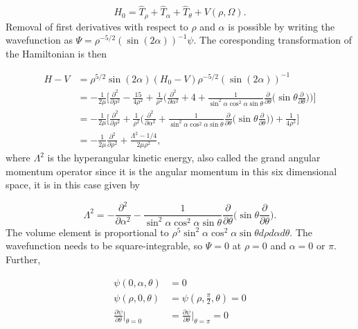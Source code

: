 \documentclass{article}
\numberwithin{equation}{section}
\begin{document}
\begin{equation}
H_0 = \hat{T}_{\rho} + \hat{T}_{\alpha} + \hat{T}_{\theta} + V(\rho,\Omega).
\end{equation}                      		
Removal of first derivatives with respect to $\rho$ and $\alpha$ is possible by writing the wavefunction as $\Psi = \rho^{-5/2}(\sin(2\alpha))^{-1}\psi$. The coresponding transformation of the Hamiltonian is then


\begin{align}
	H-V &= \rho^{5/2}\sin(2\alpha) (H_0-V) \rho^{-5/2}(\sin(2\alpha))^{-1}\nonumber\\
	    &= -\frac{1}{2\mu} \bigg[ \frac{\partial^2}{\partial\rho^2} - \frac{15}{4\rho^2} + \frac{1}{\rho^2}\bigg( \frac{\partial^2}{\partial\alpha^2} + 4 + \frac{1}{\sin^2\alpha\cos^2\alpha\sin\theta} \frac{\partial}{\partial\theta} \bigg( \sin\theta \frac{\partial}{\partial\theta} \bigg) \bigg) \bigg]\nonumber\\
	    &= -\frac{1}{2\mu} \bigg[ \frac{\partial^2}{\partial\rho^2} + \frac{1}{\rho^2}\bigg( \frac{\partial^2}{\partial\alpha^2} + \frac{1}{\sin^2\alpha\cos^2\alpha\sin\theta} \frac{\partial}{\partial\theta} \bigg( \sin\theta \frac{\partial}{\partial\theta} \bigg) \bigg) + \frac{1}{4\rho^2} \bigg]\nonumber\\
	    &= -\frac{1}{2\mu}\frac{\partial^2}{\partial\rho^2} + \frac{\Lambda^2 - 1/4}{2\mu\rho^2},
\end{align}   
where $\Lambda^2$ is the hyperangular kinetic energy, also called the grand angular momentum operator since it is the angular momentum in this six dimensional space, it is in this case given by 

\begin{equation}
\Lambda^2 = -\frac{\partial^2}{\partial\alpha^2} - \frac{1}{\sin^2\alpha\cos^2\alpha\sin\theta} \frac{\partial}{\partial\theta} \bigg( \sin\theta \frac{\partial}{\partial\theta}\bigg).
\end{equation}
The volume element is proportional to $\rho^5\sin^2\alpha\cos^2\alpha\sin\theta d\rho d\alpha d\theta$. 
The wavefunction needs to be square-integrable, so $\Psi = 0$ at $\rho=0$ and $\alpha = 0 $ or $\pi$. Further, 

\begin{subequations}
\begin{align*}
	\psi(0,\alpha,\theta) &= 0\\
	\psi(\rho,0,\theta)    &= \psi(\rho,\frac{\pi}{2},\theta) = 0\\
	\frac{\partial\psi}{\partial\theta}\bigg\rvert_{\theta = 0} &= \frac{\partial\psi}{\partial\theta}\bigg\rvert_{\theta = \pi} = 0
\end{align*}   
\end{subequations} 
\end{document}
